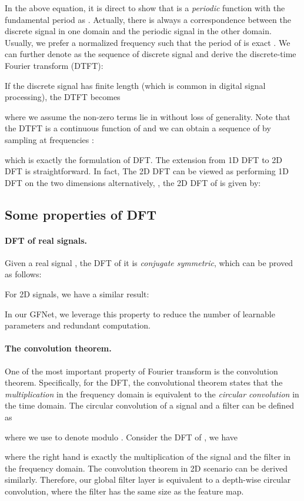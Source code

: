 \documentclass{article}
\numberwithin{equation}{section}
\begin{document}
In the above equation, it is direct to show that  is a \emph{periodic} function with the fundamental period as . Actually, there is always a correspondence between the discrete signal in one domain and the periodic signal in the other domain. Usually, we prefer a normalized frequency  such that the period of  is exact . We can further denote  as the sequence of discrete signal and derive the discrete-time Fourier transform (DTFT):


If the discrete signal  has finite length  (which is common in digital signal processing), the DTFT becomes

where we assume the non-zero terms lie in  without loss of generality. Note that the DTFT is a continuous function of  and we can obtain a sequence of  by sampling  at frequencies :

which is exactly the formulation of DFT. The extension from 1D DFT to 2D DFT is straightforward. In fact, The 2D DFT can be viewed as performing 1D DFT on the two dimensions alternatively, \ie, the 2D DFT of  is given by:


\subsection{Some properties of DFT}
\paragraph{DFT of real signals.} Given a real signal , the DFT of it is \textit{conjugate symmetric}, which can be proved as follows:

For 2D signals, we have a similar result:


In our GFNet, we leverage this property to reduce the number of learnable parameters and redundant computation.

\paragraph{The convolution theorem.} One of the most important property of Fourier transform is the convolution theorem. Specifically, for the DFT, the convolutional theorem states that the \textit{multiplication} in the frequency domain is equivalent to the \textit{circular convolution} in the time domain. The circular convolution of a signal  and a filter  can be defined as

where we use  to denote  modulo . Consider the DFT of , we have

where the right hand is exactly the multiplication of the signal and the filter in the frequency domain. The convolution theorem in 2D scenario can be derived similarly. Therefore, our global filter layer is equivalent to a depth-wise circular convolution, where the filter has the same size as the feature map.
\end{document}
